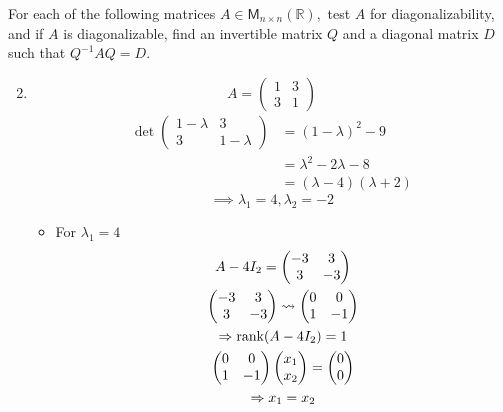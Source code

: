 For each of the following matrices $A\in \mathsf{M}_{n \times
  n}(\mathbb{R}),$ test $A$ for diagonalizability, and if $A$ is
diagonalizable, find an invertible matrix $Q$ and a diagonal matrix
$D$ such that $Q^{-1}AQ=D.$
\begin{enumerate}
\setcounter{enumii}{1}
\item
\begin{equation}
A = \begin{pmatrix}
1 & 3\\
3 & 1
\end{pmatrix}
\end{equation}
\begin{align}
\det{\begin{pmatrix}
1-\lambda & 3\\
3 & 1-\lambda
  \end{pmatrix}} & = (1-\lambda)^2 -9\\
&=\lambda^2 -2\lambda -8 \\
&= (\lambda-4)(\lambda+2)
\end{align}
\begin{equation}
\implies \lambda_1=4,\lambda_2=-2
\end{equation}
\begin{itemize}
\item For $\lambda_1 =4$
\begin{gather}
A - 4I_2 = \begin{pmatrix}
-3 & 3\\
3 & -3
\end{pmatrix}\\
\begin{pmatrix}
-3 & 3\\
3 & -3
\end{pmatrix}\leadsto
\begin{pmatrix}
0 & 0\\
1 & -1
\end{pmatrix}\\
\implies \rank{A-4I_2} = 1\\
\begin{pmatrix}
0 & 0\\
1 & -1
\end{pmatrix}
\begin{pmatrix}
x_1\\x_2
\end{pmatrix}=
\begin{pmatrix}
0\\0
\end{pmatrix}\\
\implies x_1 = x_2\\

\end{gather}
\end{itemize}
\end{enumerate}
